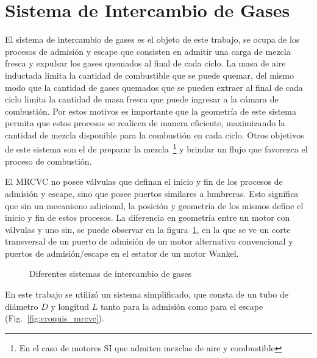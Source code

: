 \section{Sistema de Intercambio de Gases}
%
El sistema de intercambio de gases es el objeto de este trabajo, se ocupa de
los procesos de admisión y escape que consisten en admitir una carga de mezcla
fresca y expulsar los gases quemados al final de cada ciclo.
%
La masa de aire inductada limita la cantidad de combustible que se puede
quemar, del mismo modo que la cantidad de gases quemados que se pueden extraer
al final de cada ciclo limita la cantidad de masa fresca que puede ingresar a
la cámara de combustión.
%
Por estos motivos es importante que la geometría de este sistema permita que
estos procesos se realicen de manera eficiente, maximizando la cantidad de
mezcla disponible para la combustión en cada ciclo.
%
Otros objetivos de este sistema son el de preparar la mezcla~\footnote{En el
caso de motores SI que admiten mezclas de aire y combustible} y brindar un
flujo que favorezca el proceso de combustión.


El MRCVC no posee válvulas que definan el inicio y fin de los procesos de
admisión y escape, sino que posee puertos similares a lumbreras.
%
Esto significa que sin un mecanismo adicional, la posición y geometría de los
mismos define el inicio y fin de estos procesos.
%
La diferencia en geometría entre un motor con válvulas y uno sin, se puede
observar en la figura~\ref{fig:puerto_valvula}, en la que se ve un corte
transversal de un puerto de admisión de un motor alternativo convencional y
puertos de admisión/escape en el estator de un motor Wankel.

\begin{figure}
  \centering
  \caption{Diferentes sistemas de intercambio de gases}\label{fig:puerto_valvula}
\end{figure}

En este trabajo se utilizó un sistema simplificado, que consta de un tubo de
diámetro $D$ y longitud $L$ tanto para la admisión como para el escape
(Fig.~\ref{fig:croquis_mrcvc}).


